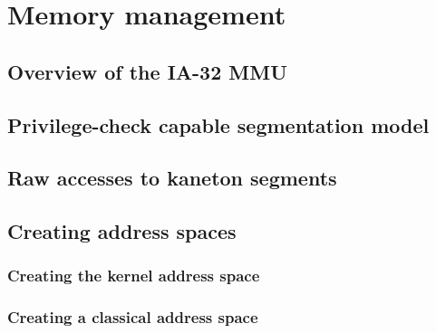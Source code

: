
%
%

\chapter{Memory management}

%
%

\section{Overview of the IA-32 MMU}

%
%

\section{Privilege-check capable segmentation model}

%
%

\section{Raw accesses to kaneton segments}

%
%

\section{Creating address spaces}

%
%

\subsection{Creating the kernel address space}

%
%

\subsection{Creating a classical address space}

%
%


